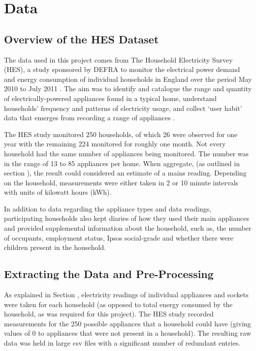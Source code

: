 \chapter{Data}


\section{Overview of the HES Dataset}
The data used in this project comes from The Household Electricity Survey (HES), a study sponsored by DEFRA to monitor the electrical power demand and energy consumption of individual households in England over the period May 2010 to July 2011 \cite{HES}. The aim was to identify and catalogue the range and quantity of electrically-powered appliances found in a typical home, understand households' frequency and patterns of electricity usage, and collect `user habit' data that emerges from recording a range of appliances \cite{early findings}.

The HES study monitored 250 households, of which 26 were observed for one year with the remaining 224 monitored for roughly one month. Not every household had the same number of appliances being monitored. The number was in the range of 13 to 85 appliances per home. When aggregate, (as outlined in section \aggregationSection), the result could considered an estimate of a mains reading. Depending on the household, measurements were either taken in  2 or 10 minute intervals with units of kilowatt hours (kWh).

In addition to data regarding the appliance types and data readings, participating households also kept diaries of how they used their main appliances and provided supplemental information about the household, such as, the number of occupants, employment status, Ipsos social-grade and whether there were children present in the household.


\section{Extracting the Data and Pre-Processing}

As explained in Section \mentionOfAggregationSection, electricity readings of individual appliances and sockets were taken for each household (as opposed to total energy consumed by the household, as was required for this project). The HES study recorded measurements for the 250 possible appliances that a household could have (giving values of 0 to appliances that were not present in a household). The resulting raw data was held in large csv files with a significant number of redundant entries. 

